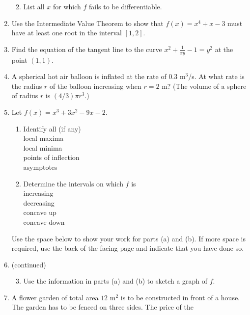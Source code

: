 \documentclass[12pt]{article}
\newcommand{\ds}{\displaystyle}
\begin{document}
\begin{enumerate}
\begin{enumerate}
\vfill
  \item List all $x$ for which $f$ fails to be differentiable.
\vfill
  \end{enumerate}
\newpage
\item Use 
  the Intermediate Value Theorem to show that $f(x)=x^4+x-3$ must have
  at least one root in the interval $[1,2]$.
\vfill
\item Find
  the equation of the tangent line to the curve $\ds x^2+\frac{1}{xy}-1=y^2$
  at the point $(1,1)$.
\vfill
\vfill
\newpage
\item A 
  spherical hot air balloon is inflated at the rate of $0.3$ m$^3$/s.  At
  what rate is the radius $r$ of the balloon increasing when $r=2$ m?
  (The volume of a sphere of radius $r$ is $(4/3)\pi r^3$.)
\vfill
\newpage
\item Let
  $f(x)=x^3+3x^2-9x-2$.
  \begin{enumerate}
  \item Identify all (if any) \\
    local maxima \hrulefill \\
    local minima \hrulefill \\
    points of inflection \hrulefill \\
    asymptotes \hrulefill 
  \item Determine the intervals on which $f$ is \\
    increasing \hrulefill \\
    decreasing \hrulefill \\
    concave up \hrulefill \\
    concave down \hrulefill
  \end{enumerate}
  Use the space below to show your work for parts (a) and (b).  If more
  space is required, use the back of the facing page and indicate that
  you have done so.
\vfill
\newpage
\addtocounter{enumi}{-1}
\item (continued)
  \begin{enumerate}
  \setcounter{enumii}{2}
  \item Use the information in parts (a) and (b) to sketch a graph of $f$.  
\vfill
  \end{enumerate}
\newpage
\item A 
  flower garden of total area $12$ m$^2$ is to be constructed in front of 
  a house.  The garden has to be fenced on three sides.  The price of the 

\end{enumerate}
\end{document}
